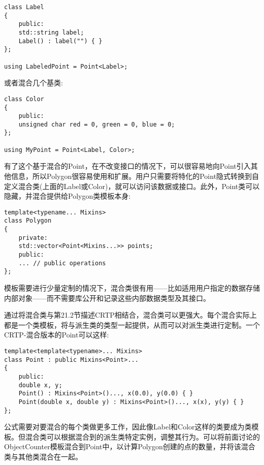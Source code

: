 \begin{lstlisting}[style=styleCXX]
class Label
{
	public:
	std::string label;
	Label() : label("") { }
};

using LabeledPoint = Point<Label>;
\end{lstlisting}

或者混合几个基类:

\begin{lstlisting}[style=styleCXX]
class Color
{
	public:
	unsigned char red = 0, green = 0, blue = 0;
};

using MyPoint = Point<Label, Color>;
\end{lstlisting}

有了这个基于混合的Point，在不改变接口的情况下，可以很容易地向Point引入其他信息，所以Polygon很容易使用和扩展。用户只需要将特化的Point隐式转换到自定义混合类(上面的Label或Color)，就可以访问该数据或接口。此外，Point类可以隐藏，并混合提供给Polygon类模板本身:

\begin{lstlisting}[style=styleCXX]
template<typename... Mixins>
class Polygon
{
	private:
	std::vector<Point<Mixins...>> points;
	public:
	... // public operations
};
\end{lstlisting}

模板需要进行少量定制的情况下，混合类很有用——比如适用用户指定的数据存储内部对象——而不需要库公开和记录这些内部数据类型及其接口。


通过将混合类与第21.2节描述CRTP相结合，混合类可以更强大。每个混合实际上都是一个类模板，将与派生类的类型一起提供，从而可以对派生类进行定制。一个CRTP-混合版本的Point可以这样:

\begin{lstlisting}[style=styleCXX]
template<template<typename>... Mixins>
class Point : public Mixins<Point>...
{
	public:
	double x, y;
	Point() : Mixins<Point>()..., x(0.0), y(0.0) { }
	Point(double x, double y) : Mixins<Point>()..., x(x), y(y) { }
};
\end{lstlisting}

公式需要对要混合的每个类做更多工作，因此像Label和Color这样的类要成为类模板。但混合类可以根据混合到的派生类特定实例，调整其行为。可以将前面讨论的ObjectCounter模板混合到Point中，以计算Polygon创建的点的数量，并将该混合类与其他类混合在一起。


